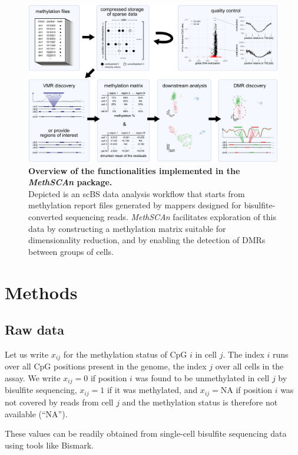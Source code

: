 \documentclass[10pt]{article}
\begin{document}
\begin{figure}[p]
	\begin{center}
		\includegraphics[width=.8\textwidth]{figures/Fig_workflow.pdf}
	\end{center}
	\caption{\small \textbf{Overview of the functionalities implemented in the \textit{MethSCAn} package.}\\
		Depicted is an scBS data analysis workflow that starts from methylation report files generated by mappers designed for bisulfite-converted sequencing reads.
		\textit{MethSCAn} facilitates exploration of this data by constructing a methylation matrix suitable for dimensionality reduction, and by enabling the detection of DMRs between groups of cells.
	}
	\label{fig:workflow}
\end{figure}



\clearpage
\section*{Methods}

\subsection*{Raw data}

Let us write $x_{ij}$ for the methylation status of CpG $i$ in cell $j$.
The index $i$ runs over all CpG positions present in the genome, the index $j$ over all cells in the assay.
We write $x_{ij}=0$ if position $i$ was found to be unmethylated in cell $j$ by bisulfite sequencing, $x_{ij}=1$ if it was methylated, and $x_{ij}=\text{NA}$ if position $i$ was not covered by reads from cell $j$ and the methylation status is therefore not available (``NA'').

These values can be readily obtained from single-cell bisulfite sequencing data using tools like Bismark.
\end{document}
